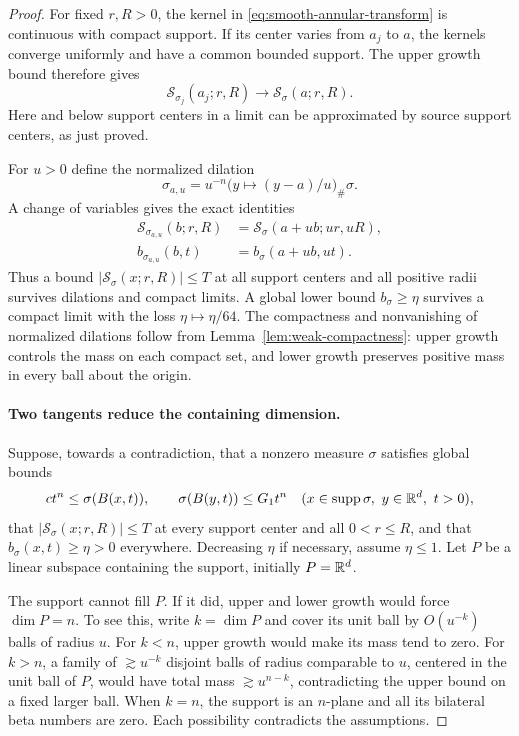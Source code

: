 \begin{proof}
For fixed $r,R>0$, the kernel in
\eqref{eq:smooth-annular-transform} is continuous with compact
support.  If its center varies from $a_j$ to $a$, the kernels
converge uniformly and have a common bounded support.  The upper
growth bound therefore gives
\begin{equation}\label{eq:annular-center-convergence}
 \mathcal S_{\sigma_j}(a_j;r,R)
       \longrightarrow \mathcal S_\sigma(a;r,R).
\end{equation}
Here and below support centers in a limit can be approximated by
source support centers, as just proved.

For $u>0$ define the normalized dilation
\[
 \sigma_{a,u}=u^{-n}
       \bigl(y\mapsto (y-a)/u\bigr)_\#\sigma.
\]
A change of variables gives the exact identities
\begin{equation}\label{eq:annular-flat-scaling}
 \begin{split}
 \mathcal S_{\sigma_{a,u}}(b;r,R)
      &=\mathcal S_\sigma(a+ub;ur,uR),\\
 b_{\sigma_{a,u}}(b,t)&=b_\sigma(a+ub,ut).
 \end{split}
\end{equation}
Thus a bound $|\mathcal S_\sigma(x;r,R)|\leq T$ at all support
centers and all positive radii survives dilations and compact
limits.  A global lower bound $b_\sigma\geq\eta$ survives a
compact limit with the loss $\eta\mapsto\eta/64$.
The compactness and nonvanishing of normalized dilations follow
from Lemma~\ref{lem:weak-compactness}: upper growth controls the
mass on each compact set, and lower growth preserves positive mass
in every ball about the origin.

\paragraph{Two tangents reduce the containing dimension.}
Suppose, towards a contradiction, that a nonzero measure $\sigma$
satisfies global bounds
\[
 c t^n\leq\sigma(B(x,t)),\qquad
 \sigma(B(y,t))\leq G_1t^n
 \quad(x\in\operatorname{supp}\sigma,\ y\in\mathbb R^d,\ t>0),
\]
that $|\mathcal S_\sigma(x;r,R)|\leq T$ at every support
center and all $0<r\leq R$, and that
$b_\sigma(x,t)\geq\eta>0$ everywhere.  Decreasing $\eta$ if
necessary, assume $\eta\leq1$.  Let $P$ be a linear subspace
containing the support, initially $P=\mathbb R^d$.

The support cannot fill $P$.  If it did, upper and lower growth
would force $\dim P=n$.  To see this, write $k=\dim P$ and
cover its unit ball by $O(u^{-k})$ balls of radius $u$.
For $k<n$, upper growth would make its mass tend to zero.
For $k>n$, a family of $\gtrsim u^{-k}$ disjoint balls of
radius comparable to $u$, centered in the unit ball of $P$,
would have total mass $\gtrsim u^{n-k}$, contradicting the
upper bound on a fixed larger ball.  When $k=n$, the support
is an $n$-plane and all its bilateral beta numbers are zero.
Each possibility contradicts the assumptions.


\end{proof}
